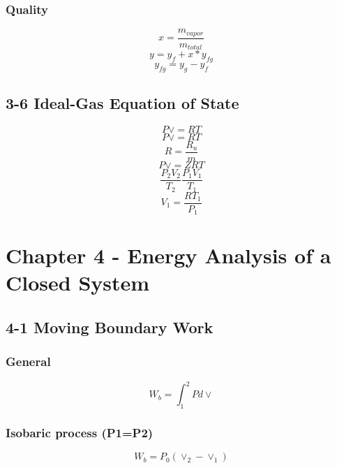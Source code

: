 \documentclass[10pt,landscape]{article}
\begin{document}
\begin{multicols}{3}
\subsubsection{Quality}
\begin{equation}
    x=\frac{m_{vapor}}{m_{total}}
\end{equation}
\begin{equation}
    y=y_f+x*y_{fg}
\end{equation}
\begin{equation}
    y_{fg}=y_g-y_f
\end{equation}
\subsection{3-6 Ideal-Gas Equation of State}
\begin{equation}
    P\vee=RT
\end{equation}
\begin{equation}
    P\vee=RT
\end{equation}
\begin{equation}
    R=\frac{R_u}{m}
\end{equation}
\begin{equation}
    P\vee=ZRT
\end{equation}
\begin{equation}
    \frac{P_2V_2}{T_2}\frac{P_1V_1}{T_1}
\end{equation}
\begin{equation}
    V_1=\frac{RT_1}{P_1}
\end{equation}

\section{Chapter 4 - Energy Analysis of a Closed System}
\subsection{4-1 Moving Boundary Work}
\subsubsection{General}
\begin{equation}
    W_b=\int^2_1Pd\vee
\end{equation}
\subsubsection{Isobaric process (P1=P2)}
\begin{equation}
    W_b=P_0(\vee_2-\vee_1)
\end{equation}

\end{multicols}
\end{document}
